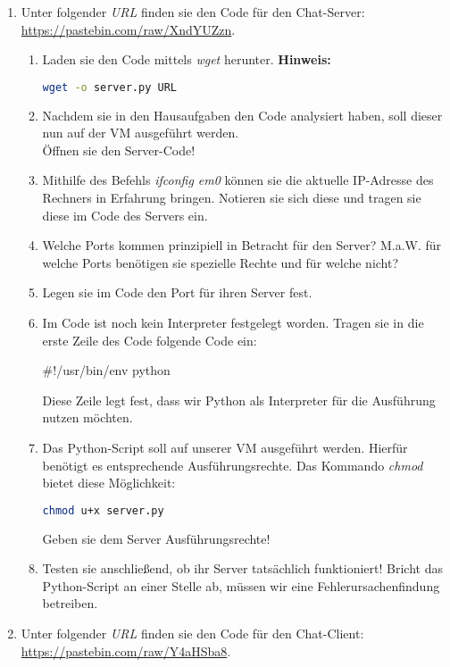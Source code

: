 \documentclass[paper=a4,fontsize=11pt]{scrartcl}%
\numberwithin{equation}{section}
\begin{document}
\begin{enumerate}
	\item Unter folgender \emph{URL} finden sie den Code für den Chat-Server: \url{https://pastebin.com/raw/XndYUZzn}.
	\begin{enumerate}
		\item Laden sie den Code mittels \emph{wget} herunter.
		\textbf{Hinweis:}
		\begin{lstlisting}[style=Bash, language=Bash]
wget -o server.py URL
		\end{lstlisting}
		\item Nachdem sie in den Hausaufgaben den Code analysiert haben, soll dieser nun auf der VM ausgeführt werden.\\
		Öffnen sie den Server-Code!
		\item Mithilfe des Befehls \emph{ifconfig em0} können sie die aktuelle IP-Adresse des Rechners in Erfahrung bringen. Notieren sie sich diese und tragen sie diese im Code des Servers ein.
		\item Welche Ports kommen prinzipiell in Betracht für den Server? M.a.W. für welche Ports benötigen sie spezielle Rechte und für welche nicht?
		\item Legen sie im Code den Port für ihren Server fest.
		\item Im Code ist noch kein Interpreter festgelegt worden. Tragen sie in die erste Zeile des Code folgende Code ein:
		\begin{python}
#!/usr/bin/env python
		\end{python}
		Diese Zeile legt fest, dass wir Python als Interpreter für die Ausführung nutzen möchten.
		\item Das Python-Script soll auf unserer VM ausgeführt werden. Hierfür benötigt es entsprechende Ausführungsrechte. Das Kommando \emph{chmod} bietet diese Möglichkeit:\\
		\begin{lstlisting}[style=Bash, language=Bash]
chmod u+x server.py
		\end{lstlisting}
		Geben sie dem Server Ausführungsrechte!
		\item Testen sie anschließend, ob ihr Server tatsächlich funktioniert! Bricht das Python-Script an einer Stelle ab, müssen wir eine Fehlerursachenfindung betreiben.
	\end{enumerate}
	\item Unter folgender \emph{URL} finden sie den Code für den Chat-Client: \url{https://pastebin.com/raw/Y4aHSba8}.
	\begin{enumerate}

\end{enumerate}
\end{enumerate}
\end{document}
